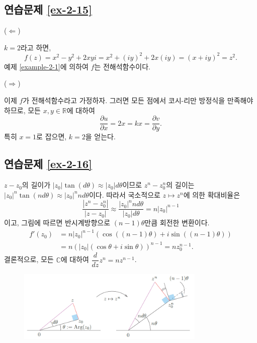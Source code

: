 \subsection*{연습문제 \ref{ex-2-15}}

($\Leftarrow$)

$k=2$라고 하면,
\[
f(z) = x^2-y^2 + 2xyi = x^2 + (iy)^2 + 2x(iy) = (x+iy)^2 = z^2.
\]
예제 \ref{example-2-1}에 의하여 $f$는 전해석함수이다.

\noindent($\Rightarrow$)

이제 $f$가 전해석함수라고  가정하자.
그러면 모든 점에서 코시-리만 방정식을 만족해야 하므로, 모든 $x, y\in \mathbb R$에 대하여
\[
\dfrac{\partial u}{\partial x} = 2x = kx = \dfrac{\partial v}{\partial y}.
\]
특히 $x=1$로 잡으면, $k=2$을 얻는다.

\subsection*{연습문제 \ref{ex-2-16}}

$z-z_0$의 길이가 $|z_0|\tan(d\theta) \approx |z_0| d\theta$이므로
$z^n-z_0^n$의 길이는 $|z_0|^n\tan(nd\theta) \approx |z_0|^nnd\theta$이다.
따라서 국소적으로 $z\mapsto z^n$에 의한 확대비율은
\[
 \dfrac{|z^n-z_0^n|}{|z-z_0|} \approx \dfrac{|z_0|^n nd\theta}{|z_0|d\theta}
 = n|z_0|^{n-1}
\]
이고, 그림에 따르면 반시계방향으로 $(n-1)\theta$만큼 회전한 변환이다.
\begin{align*}
f'(z_0) &= n|z_0|^{n-1} ( \cos((n-1)\theta) + i\sin((n-1)\theta) ) \\
&= n(|z_0|(\cos\theta + i\sin\theta))^{n-1} = nz_0^{n-1}.
\end{align*}
결론적으로, 모든 $\mathbb C$에 대하여 $\dfrac d{dz} z^n = nz^{n-1}$.

\begin{figure}[h!]
\begin{center}
\includegraphics[width=0.8\textwidth]{./figs/fig-s-0-6}
\end{center}
\end{figure}

